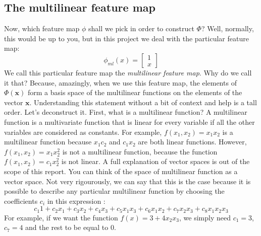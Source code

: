 \documentclass{article}
\theoremstyle{definition}
\theoremstyle{definition}
\begin{document}
\subsection{The multilinear feature map}
Now, which feature map $\phi$ shall we pick in order to construct $\Phi$?
Well, normally, this would be up to you, but in this project we deal with the particular feature map:
\begin{equation}
    \phi_{ml}(x) = 
    \begin{bmatrix}
        1 \\
        x
    \end{bmatrix}
\end{equation}
We call this particular feature map the \emph{multilinear feature map}.
Why do we call it that? Because, amazingly, when we use this feature map, the elements of $\Phi(\mathbf{x})$ form a basis space of the multilinear functions on the elements of the vector $\mathbf{x}$.
Understanding this statement without a bit of context and help is a tall order. Let's deconstruct it.
First, what is a multilinear function? A multilinear function is a multivariate function that is linear for every variable if all the other variables are considered as constants. For example, $f(x_1, x_2) = x_1 x_2$ is a multilinear function because $x_1 c_2$ and $c_1 x_2$ are both linear functions. However, $f(x_1, x_2) = x_1 x_2^2$ is not a multilinear function, because the function $f(x_1, x_2) = c_1 x_2^2$ is not linear. A full explanation of vector spaces is out of the scope of this report. You can think of the space of multilinear function as a vector space. Not very rigourously, we can say that this is the case because it is possible to describe any particular multilinear function by choosing the coefficients $c_i$ in this expression :
\[
    c_1 1 + c_2 x_1 + c_3 x_2 + c_4 x_3  + c_5 x_1 x_3 + c_6 x_1 x_2 + c_7 x_2 x_3 + c_8 x_1 x_2 x_3
\]
For example, if we want the function $f(x) = 3 + 4 x_2 x_3$, we simply need $c_1 = 3$, $c_7 = 4$ and the rest to be equal to $0$.
\end{document}
